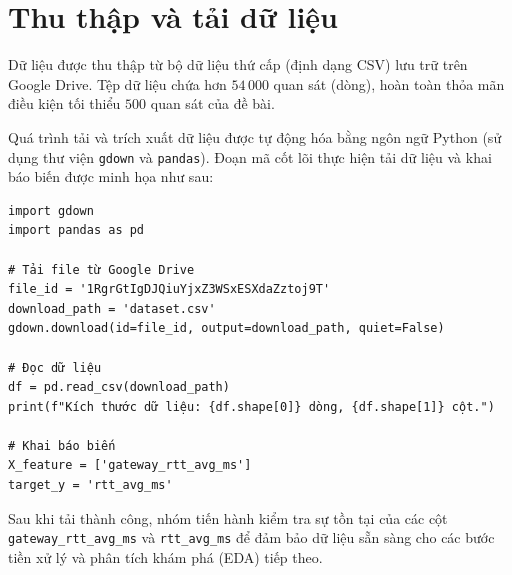 
\section{Thu thập và tải dữ liệu}

Dữ liệu được thu thập từ bộ dữ liệu thứ cấp (định dạng CSV) lưu trữ trên Google Drive. Tệp dữ liệu chứa hơn \(54\,000\) quan sát (dòng), hoàn toàn thỏa mãn điều kiện tối thiểu \(500\) quan sát của đề bài. 

Quá trình tải và trích xuất dữ liệu được tự động hóa bằng ngôn ngữ Python (sử dụng thư viện \texttt{gdown} và \texttt{pandas}). Đoạn mã cốt lõi thực hiện tải dữ liệu và khai báo biến được minh họa như sau:

\begin{verbatim}
import gdown
import pandas as pd

# Tải file từ Google Drive
file_id = '1RgrGtIgDJQiuYjxZ3WSxESXdaZztoj9T'
download_path = 'dataset.csv'
gdown.download(id=file_id, output=download_path, quiet=False)

# Đọc dữ liệu
df = pd.read_csv(download_path)
print(f"Kích thước dữ liệu: {df.shape[0]} dòng, {df.shape[1]} cột.")

# Khai báo biến
X_feature = ['gateway_rtt_avg_ms']
target_y = 'rtt_avg_ms'
\end{verbatim}

Sau khi tải thành công, nhóm tiến hành kiểm tra sự tồn tại của các cột \texttt{gateway\_rtt\_avg\_ms} và \texttt{rtt\_avg\_ms} để đảm bảo dữ liệu sẵn sàng cho các bước tiền xử lý và phân tích khám phá (EDA) tiếp theo.